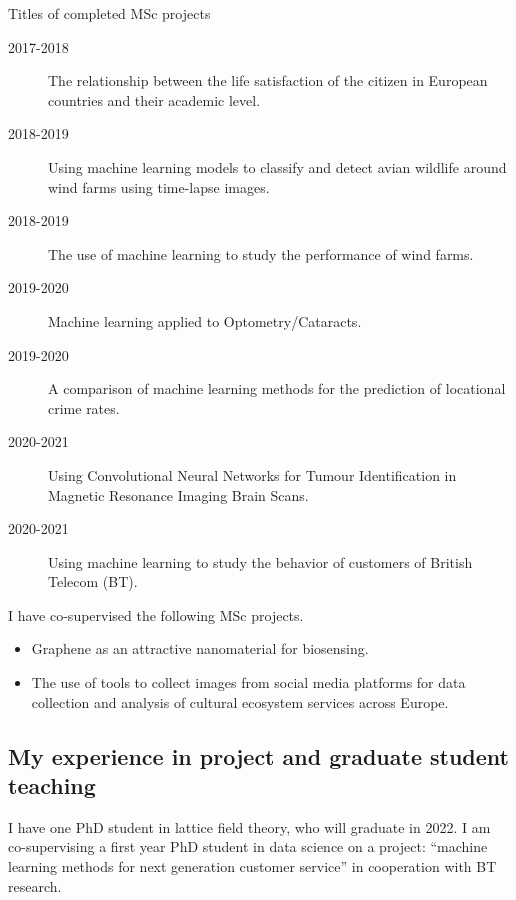 \documentclass[12pt]{article}
\begin{document}
Titles of completed MSc projects
\begin{description}

\item[2017-2018] The relationship between the life satisfaction of the
citizen in European countries and their academic level.

\item[2018-2019] Using machine learning models to classify and detect
  avian wildlife around wind farms using time-lapse images.

\item[2018-2019] The use of machine learning to study the performance
  of wind farms.

\item[2019-2020] Machine learning applied to Optometry/Cataracts.

\item[2019-2020] A comparison of machine learning methods for the
  prediction of locational crime rates.

\item[2020-2021] Using Convolutional Neural Networks
for Tumour Identification in
Magnetic Resonance Imaging
Brain Scans.

\item[2020-2021] Using machine learning to study the behavior of
  customers of British Telecom (BT). 

\end{description}

I have co-supervised the following MSc projects.

\begin{itemize}

\item  Graphene as an attractive nanomaterial for biosensing.

\item The use of tools to collect images from social media
platforms for data collection and analysis of cultural
ecosystem services across Europe.

\end{itemize}

\subsection{My experience in project and graduate student teaching}

I have one PhD student in lattice field theory, who will graduate in
2022. I am co-supervising a first year PhD student in data science on
a project: ``machine learning methods for next generation customer
service'' in cooperation with BT research.
\end{document}
